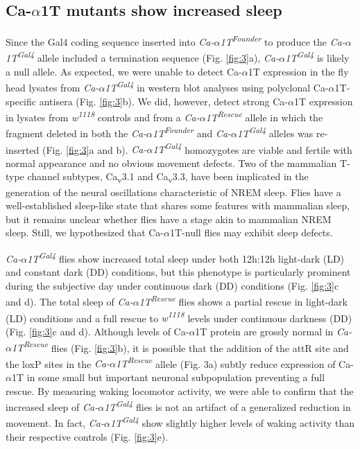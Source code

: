 \subsection*{Ca-$\alpha$1T mutants show increased sleep}

Since the Gal4 coding sequence inserted into \emph{Ca-$\alpha$1T\textsuperscript{Founder}} to produce the \emph{Ca-$\alpha$1T\textsuperscript{Gal4}} allele included a termination sequence (Fig. \ref{fig:3}a), \emph{Ca-$\alpha$1T\textsuperscript{Gal4}} is likely a null allele.
As expected, we were unable to detect Ca-$\alpha$1T expression in the fly head lysates from \emph{Ca-$\alpha$1T\textsuperscript{Gal4}} in western blot analyses using polyclonal Ca-$\alpha$1T-specific antisera (Fig. \ref{fig:3}b). We did, however, detect strong Ca-$\alpha$1T expression in lysates from \emph{w\textsuperscript{1118}} controls and from a \emph{Ca-$\alpha$1T\textsuperscript{Rescue}} allele in which the fragment deleted in both the \emph{Ca-$\alpha$1T\textsuperscript{Founder}} and \emph{Ca-$\alpha$1T\textsuperscript{Gal4}} alleles was re-inserted (Fig. \ref{fig:3}a and b).
\emph{Ca-$\alpha$1T\textsuperscript{Gal4}} homozygotes are viable and fertile with normal appearance and no obvious movement defects.
Two of the mammalian T-type channel subtypes, Ca\textsubscript{v}3.1 and Ca\textsubscript{v}3.3, have been implicated in the generation of the neural oscillations characteristic of NREM sleep\cite{Lee:2004ey,astori:2011aa}.
Flies have a well-established sleep-like state that shares some features with mammalian sleep, but it remains unclear whether flies have a stage akin to mammalian NREM sleep.
Still, we hypothesized that Ca-$\alpha$1T-null flies may exhibit sleep defects.

\emph{Ca-$\alpha$1T\textsuperscript{Gal4}} flies show increased total sleep under both 12h:12h light-dark (LD) and constant dark (DD) conditions, but this phenotype is particularly prominent during the subjective day under continuous dark (DD) conditions (Fig. \ref{fig:3}c and d).
The total sleep of \emph{Ca-$\alpha$1T\textsuperscript{Rescue}} flies shows a partial rescue in light-dark (LD) conditions and a full rescue to \emph{w\textsuperscript{1118}} levels under continuous darkness (DD) (Fig. \ref{fig:3}c and d).
Although levels of Ca-$\alpha$1T protein are grossly normal in \emph{Ca-$\alpha$1T\textsuperscript{Rescue}} flies (Fig. \ref{fig:3}b), it is possible that the addition of the attR site and the loxP sites in the \emph{Ca-$\alpha$1T\textsuperscript{Rescue}} allele (Fig. 3a) subtly reduce expression of Ca-$\alpha$1T in some small but important neuronal subpopulation preventing a full rescue.
By measuring waking locomotor activity, we were able to confirm that the increased sleep of \emph{Ca-$\alpha$1T\textsuperscript{Gal4}} flies is not an artifact of a generalized reduction in movement. In fact, \emph{Ca-$\alpha$1T\textsuperscript{Gal4}} show slightly higher levels of waking activity than their respective controls (Fig. \ref{fig:3}e).

